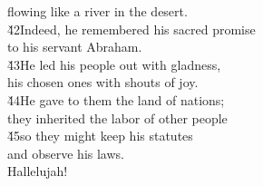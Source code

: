 \begin{poetry}
\poemll    flowing like a river in the desert. \\
\poeml \v{42}Indeed, he remembered his sacred promise \\
\poemll    to his servant Abraham. \\
\poeml \v{43}He led his people out with gladness, \\
\poemll    his chosen ones with shouts of joy. \\
\poeml \v{44}He gave to them the land of nations; \\
\poemll    they inherited the labor of other people \\
\poeml \v{45}so they might keep his statutes \\
\poemll    and observe his laws. \\
\poemlll       Hallelujah!
\end{poetry}


